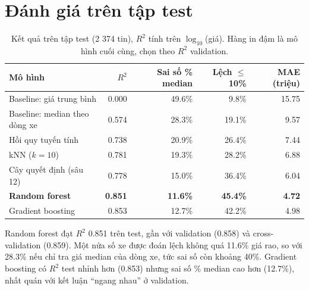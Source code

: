 \section{Đánh giá trên tập test}

\begin{table}[H]\centering
\caption{Kết quả trên tập test (2 374 tin), $R^2$ tính trên $\log_{10}$(giá). Hàng in đậm là mô hình cuối cùng, chọn
theo $R^2$ validation.}\label{tab:tab-test}
\begin{tabular}{lrrrr}
\toprule
Mô hình & $R^2$ & Sai số \% median & Lệch $\le$ 10\% & MAE (triệu) \\
\midrule
Baseline: giá trung bình & 0.000 & 49.6\% & 9.8\% & 15.75 \\
Baseline: median theo dòng xe & 0.574 & 28.3\% & 19.1\% & 9.57 \\
Hồi quy tuyến tính & 0.738 & 20.9\% & 26.4\% & 7.44 \\
kNN ($k=10$) & 0.781 & 19.3\% & 28.2\% & 6.88 \\
Cây quyết định (sâu 12) & 0.778 & 15.0\% & 36.4\% & 6.04 \\
\textbf{Random forest} & \textbf{0.851} & \textbf{11.6\%} & \textbf{45.4\%} & \textbf{4.72} \\
Gradient boosting & 0.853 & 12.7\% & 42.2\% & 4.98 \\
\bottomrule
\end{tabular}
\end{table}

Random forest đạt $R^2$ 0.851 trên test, gần với validation (0.858) và cross-validation (0.859). Một nửa số xe được đoán
lệch không quá 11.6\% giá rao, so với 28.3\% nếu chỉ tra giá median của dòng xe, tức sai số còn khoảng 40\%. Gradient
boosting có $R^2$ test nhỉnh hơn (0.853) nhưng sai số \% median cao hơn (12.7\%), nhất quán với kết luận ``ngang nhau'' ở
validation.



